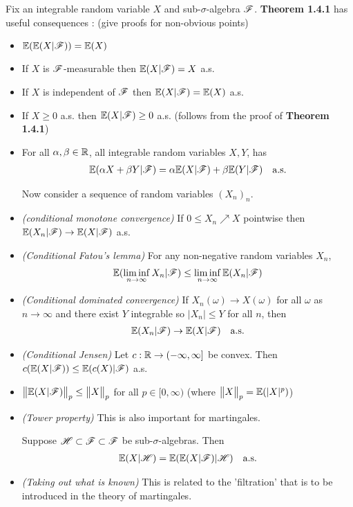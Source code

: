 \documentclass[10pt,a4paper]{report}
\begin{document}
Fix an integrable random variable $X$ and sub-$\sigma$-algebra $\mathscr{F}$. \textbf{Theorem 1.4.1} has useful consequences : (give proofs for non-obvious points)
\begin{itemize}
\item[(i)] $\mathbb{E} (\mathbb{E}(X|\mathscr{F})) = \mathbb{E}(X)$
\item[(ii)] If $X$ is $\mathscr{F}$-measurable then $\mathbb{E}(X|\mathscr{F}) =X$ a.s.
\item[(iii)] If $X$ is independent of $\mathscr{F}$ then $\mathbb{E}(X|\mathscr{F}) = \mathbb{E}(X)$ a.s.
\item[(iv)] If $X\geq 0$ a.s. then $\mathbb{E}(X|\mathscr{F}) \geq 0$ a.s. (follows from the proof of \textbf{Theorem 1.4.1})
\item[(v)] For all $\alpha, \beta\in \mathbb{R}$, all integrable random variables $X,Y$, has
\begin{align*}
\mathbb{E}(\alpha X + \beta Y |\mathscr{F}) = \alpha \mathbb{E}(X|\mathscr{F}) + \beta \mathbb{E}(Y|\mathscr{F}) \quad \text{a.s.}
\end{align*}
\s

Now consider a sequence of random variables $(X_n)_n$. 
\item[(vi)] \emph{(conditional monotone convergence)} If $0\leq X_n \nearrow X$ pointwise then $\mathbb{E}(X_n |\mathscr{F})\rightarrow \mathbb{E}(X|\mathscr{F})$ a.s.
\item[(vii)] \emph{(Conditional Fatou's lemma)} For any non-negative random variables $X_n$,
\begin{align*}
\mathbb{E}(\liminf_{n\rightarrow \infty} X_n |\mathscr{F}) \leq \liminf_{n\rightarrow \infty} \mathbb{E}(X_n |\mathscr{F})
\end{align*}

\item[(viii)] \emph{(Conditional dominated convergence)} If $X_n(\omega) \rightarrow X(\omega)$ for all $\omega$ as $n\rightarrow \infty$ and there exist $Y$ integrable so $|X_n| \leq Y$ for all $n$, then 
\begin{align*}
\mathbb{E}(X_n|\mathscr{F}) \rightarrow \mathbb{E}(X|\mathscr{F}) \quad \text{a.s.}
\end{align*}
\item[(ix)] \emph{(Conditional Jensen)} Let $c: \mathbb{R} \rightarrow (-\infty, \infty]$ be convex. Then $c(\mathbb{E}(X|\mathscr{F})) \leq \mathbb{E}( c(X) |\mathscr{F})$ a.s.
\item[(x)] $\bigl\lVert\mathbb{E}(X|\mathscr{F})\bigr\rVert_{p}\leq \bigl\lVert X\bigr\rVert_{p}$ for all $p\in [0,\infty)$ (where $\bigl\lVert X\bigr\rVert_{p} = \mathbb{E}(|X|^p)$)
\item[(xi)] \emph{(Tower property)} This is also important for martingales.

Suppose $\mathscr{H} \subset \mathscr{F} \subset \mathscr{F}$ be sub-$\sigma$-algebras. Then
\begin{align*}
\mathbb{E}(X|\mathscr{H}) = \mathbb{E}(\mathbb{E}(X|\mathscr{F})|\mathscr{H}) \quad \text{a.s.}
\end{align*}
\item[(xii)] \emph{(Taking out what is known)} This is related to the 'filtration' that is to be introduced in the theory of martingales.


\end{itemize}
\end{document}
